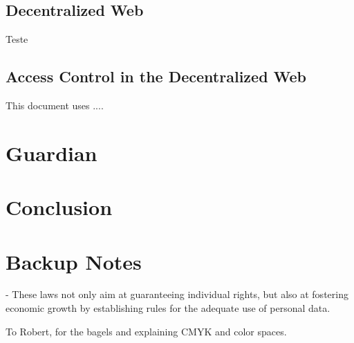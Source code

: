 \documentclass[sigconf]{acmart}
\begin{document}
\subsection{Decentralized Web}
Teste \cite{Polleres2018}

\subsection{Access Control in the Decentralized Web}

This document uses ....

\section{Guardian}


\section{Conclusion}


\section{Backup Notes}
- These laws not only aim at guaranteeing individual rights, but also at fostering economic growth by establishing rules for the adequate use of personal data.

%
\begin{acks}
To Robert, for the bagels and explaining CMYK and color spaces.
\end{acks}

%


\end{document}
